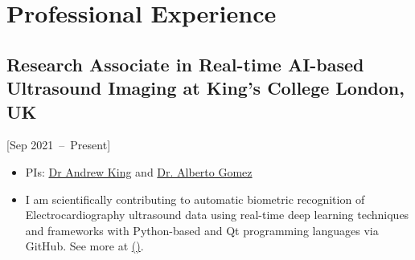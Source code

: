 \documentclass{mycv}
\begin{document}

\section{Professional Experience}
\subsection{Research Associate in Real-time AI-based Ultrasound Imaging at King's College London, UK}[Sep 2021~--~Present]
\begin{itemize}
  \item PIs: \href{http://kclmmag.org/}{Dr Andrew King} and  \href{https://gomezalberto.github.io/}{Dr. Alberto Gomez}
  \item 
I am scientifically contributing to automatic biometric recognition of Electrocardiography ultrasound data using real-time deep learning techniques and frameworks with Python-based and Qt programming languages via GitHub.
See more at \href{http://vital.oucru.org/major-partners/kings-college-london/}{(\faExternalLink)}.
\end{itemize}
\end{document}
